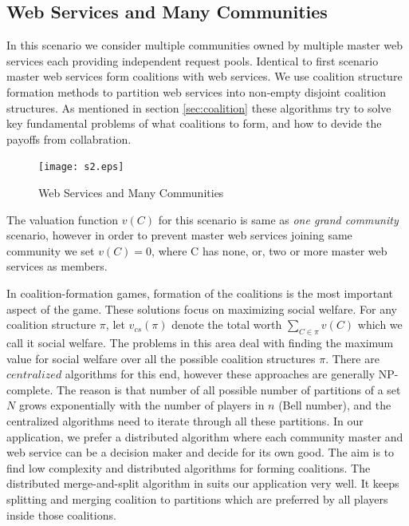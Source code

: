 \documentclass[10pt, conference, compsocconf]{IEEEtran}
\theoremstyle{plain}
\theoremstyle{definition}
\begin{document}
\subsection {Web Services and Many Communities}

In this scenario we consider multiple communities owned by multiple master web services each providing independent request pools. Identical to first scenario master web services form coalitions with web services. We use coalition structure formation methods to partition web services into non-empty disjoint coalition structures. As mentioned in section \ref{sec:coalition} these algorithms \cite{Sandholm1999209, DBLP:conf/ijcai/GrecoMPS11, DBLP:conf/ijcai/RahwanMJ11} try to solve key fundamental problems of what coalitions to form, and how to devide the payoffs from collabration. 

\begin{figure}[!t]
\centering
\texttt{[image: s2.eps]}
\caption{Web Services and Many Communities}
\label{fig_sim}
\end{figure}

The valuation function $v(C)$ for this scenario is same as \emph{one grand community} scenario, however in order to prevent master web services joining same community we set $v(C) = 0$, where C has none, or, two or more master web services as members. 

In coalition-formation games, formation of the coalitions is the most important aspect of the game. These solutions focus on maximizing social welfare. For any coalition structure $\pi$, let $v_{cs}(\pi)$ denote the total worth $\sum_{C \in \pi}{v(C)}$ which we call it social welfare. The problems in this area deal with finding the maximum value for social welfare over all the possible coalition structures $\pi$. There are $centralized$ algorithms for this end, however these approaches are generally NP-complete. The reason is that number of all possible number of partitions of a set $N$ grows exponentially with the number of players in $n$ (Bell number), and the centralized algorithms need to iterate through all these partitions. 
In our application, we prefer a distributed algorithm where each community master and web service can be a decision maker and decide for its own good. The aim is to find low complexity and distributed algorithms for forming coalitions\cite{DBLP:journals/igtr/AptW09,Dieckmann02dynamiccoalition,ray2007game}. The distributed merge-and-split algorithm in \cite{DBLP:journals/igtr/AptW09} suits our application very well. It keeps splitting and merging coalition to partitions which are preferred by all players inside those coalitions. 
\end{document}
